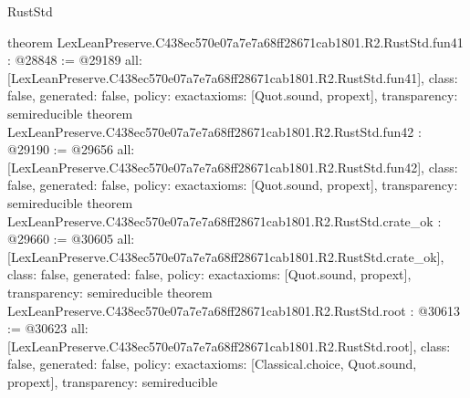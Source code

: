 \begin{lexlean}{RustStd}
\begin{coremodule}
{}
theorem LexLeanPreserve.C438ec570e07a7e7a68ff28671cab1801.R2.RustStd.fun41 : @28848 := @29189 {
  all: [LexLeanPreserve.C438ec570e07a7e7a68ff28671cab1801.R2.RustStd.fun41],
  class: false,
  generated: false,
  policy: exact{axioms: [Quot.sound, propext]},
  transparency: semireducible
}
theorem LexLeanPreserve.C438ec570e07a7e7a68ff28671cab1801.R2.RustStd.fun42 : @29190 := @29656 {
  all: [LexLeanPreserve.C438ec570e07a7e7a68ff28671cab1801.R2.RustStd.fun42],
  class: false,
  generated: false,
  policy: exact{axioms: [Quot.sound, propext]},
  transparency: semireducible
}
theorem LexLeanPreserve.C438ec570e07a7e7a68ff28671cab1801.R2.RustStd.crate_ok : @29660 := @30605 {
  all: [LexLeanPreserve.C438ec570e07a7e7a68ff28671cab1801.R2.RustStd.crate_ok],
  class: false,
  generated: false,
  policy: exact{axioms: [Quot.sound, propext]},
  transparency: semireducible
}
theorem LexLeanPreserve.C438ec570e07a7e7a68ff28671cab1801.R2.RustStd.root : @30613 := @30623 {
  all: [LexLeanPreserve.C438ec570e07a7e7a68ff28671cab1801.R2.RustStd.root],
  class: false,
  generated: false,
  policy: exact{axioms: [Classical.choice, Quot.sound, propext]},
  transparency: semireducible
}


\end{coremodule}
\end{lexlean}
